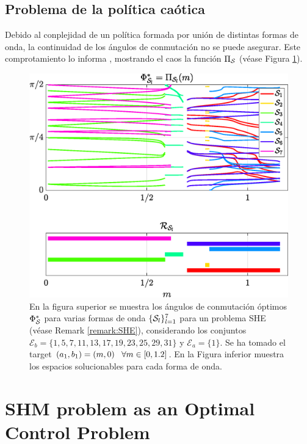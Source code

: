 \documentclass[twocolumn]{autart}    %
\begin{document}
\subsection{Problema de la política caótica} \label{subsec:Non-continuous policy}
 

Debido al conplejidad de un política formada por unión de  distintas formas de onda, la continuidad de los ángulos de conmutación no se puede asegurar. Este comprotamiento lo informa \cite{Yang2017}, mostrando el caos la función $\Pi_{\mathcal{S}}$ (véase Figura \ref{fig:chaos_policy}).
	

\begin{figure}
	\centering
	\includegraphics[scale=0.35]{img/fig01a.eps}
	\caption{En la figura superior se muestra los ángulos de conmutación óptimos $\Phi^*_{\mathcal{S}}$ para varias formas de onda $\{\mathcal{S}_l\}_{l=1}^7$ para un problema SHE (véase Remark \ref{remark:SHE}), considerando los conjuntos   $\mathcal{E}_b = \{1,     5,     7,    11 ,   13  ,  17  ,  19   , 23 ,   25  ,  29  ,  31\}$ y $\mathcal{E}_a = \{1\}$. Se ha tomado el  target $(a_1,b_1) = (m,0) \hspace{0.5em} \forall m \in [0,1.2]$. En la Figura inferior muestra los espacios solucionables para cada forma de onda.}
	\label{fig:chaos_policy}
\end{figure}

\JOEnd

\section{SHM problem as an Optimal Control Problem}\label{sec:Contributions}
\end{document}
